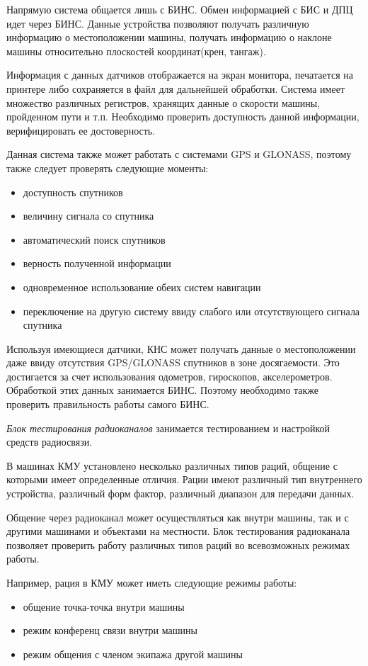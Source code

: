 Напрямую система общается лишь с БИНС. Обмен информацией с БИС и ДПЦ идет через БИНС.
Данные устройства позволяют получать различную информацию о местоположении машины, получать информацию о наклоне
машины относительно плоскостей координат(крен, тангаж).

Информация с данных датчиков отображается на экран монитора, печатается на принтере либо сохраняется в файл для
дальнейшей обработки. Система имеет множество различных регистров, хранящих данные о скорости машины, пройденном пути и
т.п. Необходимо проверить доступность данной информации, верифицировать ее достоверность.

Данная система также может работать с системами GPS и GLONASS, поэтому также следует проверять следующие моменты:
\begin{itemize}
	\item доступность спутников
	\item величину сигнала со спутника
	\item автоматический поиск спутников
	\item верность полученной информации
	\item одновременное использование обеих систем навигации
	\item переключение на другую систему ввиду слабого или отсутствующего сигнала спутника
\end{itemize}

Используя имеющиеся датчики, КНС может получать данные о местоположении даже ввиду отсутствия GPS/GLONASS спутников в
зоне досягаемости.
Это достигается за счет использования одометров, гироскопов, акселерометров. Обработкой этих данных
занимается БИНС.
Поэтому необходимо также проверить правильность работы самого БИНС.

\textit{Блок тестирования радиоканалов} занимается тестированием и настройкой средств радиосвязи.

В машинах КМУ установлено несколько различных типов раций, общение с которыми имеет определенные отличия.
Рации имеют
различный тип внутреннего устройства, различный форм фактор, различный диапазон для передачи данных.

Общение через радиоканал может осуществляться как внутри машины, так и с другими машинами и объектами на местности.
Блок тестирования радиоканала позволяет проверить работу различных типов раций во всевозможных режимах работы.

Например, рация в КМУ может иметь следующие режимы работы:
\begin{itemize}
		\item общение точка-точка внутри машины
		\item режим конференц связи внутри машины
		\item режим общения с членом экипажа другой машины
\end{itemize}

